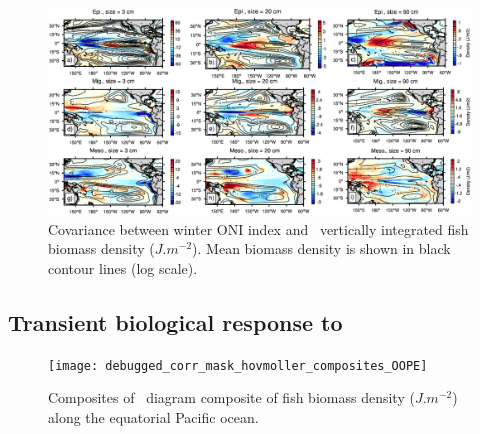 \begin{figure}[h!]
    \centering
    \includegraphics[width=\textwidth] {figs/debugged_corr_mask_covariance_maps_OOPE.pdf}
    \caption{Covariance between winter ONI index and \ap\ vertically integrated fish biomass density ($J.m^{-2}$). Mean biomass density is shown in black contour lines (log scale).}
    \label{fig:cov-ape}
\end{figure}

\subsection{Transient biological response to \nino}

\begin{figure}[h!]
    \centering
    \texttt{[image: debugged\_corr\_mask\_hovmoller\_composites\_OOPE]}
    \caption{Composites of \hov\ diagram composite of fish biomass density ($J.m^{-2}$) along the equatorial Pacific ocean.}
    \label{fig:hov-oope}
\end{figure}

\clearpage

